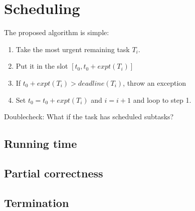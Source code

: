 \section{Scheduling}

The proposed algorithm is simple: 

\begin{enumerate}
    \item Take the most urgent remaining task $T_i$.
    \item Put it in the slot $[t_0, t_0 + expt(T_i)]$
    \item If $t_0 + expt(T_i) > deadline(T_i)$, throw an exception
    \item Set $t_0 = t_0 + expt(T_i)$ and $i = i+1$ and loop to step 1.
\end{enumerate}

Doublecheck: What if the task has scheduled subtasks?

\subsection{Running time}

\subsection{Partial correctness}

\subsection{Termination}